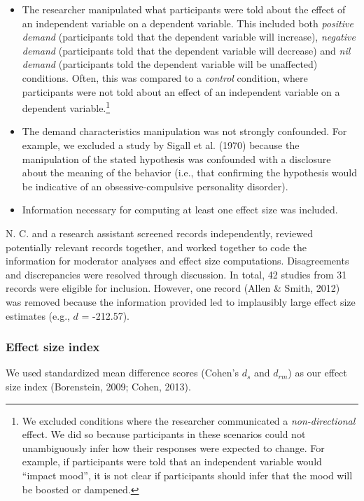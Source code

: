 \documentclass[
  man,floatsintext]{apa6}
\begin{document}
\begin{itemize}
\item
  The researcher manipulated what participants were told about the effect of an independent variable on a dependent variable. This included both \emph{positive demand} (participants told that the dependent variable will increase), \emph{negative demand} (participants told that the dependent variable will decrease) and \emph{nil demand} (participants told the dependent variable will be unaffected) conditions. Often, this was compared to a \emph{control} condition, where participants were not told about an effect of an independent variable on a dependent variable.\footnote{We excluded conditions where the researcher communicated a \emph{non-directional} effect. We did so because participants in these scenarios could not unambiguously infer how their responses were expected to change. For example, if participants were told that an independent variable would ``impact mood'', it is not clear if participants should infer that the mood will be boosted or dampened.}
\item
  The demand characteristics manipulation was not strongly confounded. For example, we excluded a study by Sigall et al. (1970) because the manipulation of the stated hypothesis was confounded with a disclosure about the meaning of the behavior (i.e., that confirming the hypothesis would be indicative of an obsessive-compulsive personality disorder).
\item
  Information necessary for computing at least one effect size was included.
\end{itemize}

N. C. and a research assistant screened records independently, reviewed potentially relevant records together, and worked together to code the information for moderator analyses and effect size computations. Disagreements and discrepancies were resolved through discussion. In total, 42 studies from 31 records were eligible for inclusion. However, one record (Allen \& Smith, 2012) was removed because the information provided led to implausibly large effect size estimates (e.g., \(d\) = -212.57).

\hypertarget{effect-size-index}{%
\subsubsection{Effect size index}\label{effect-size-index}}

We used standardized mean difference scores (Cohen's \(d_{s}\) and \(d_{rm}\)) as our effect size index (Borenstein, 2009; Cohen, 2013).
\end{document}

